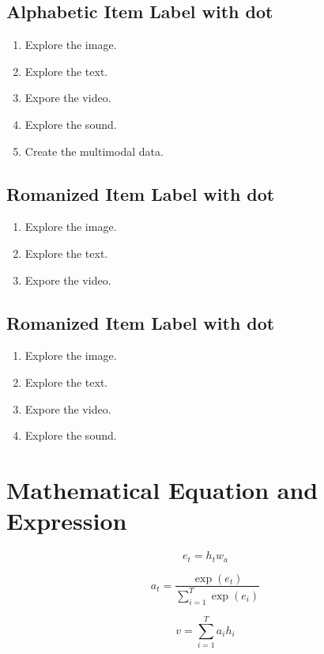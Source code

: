 \documentclass[11pt]{article}
\begin{document}
\subsection{Alphabetic Item Label with dot}
\begin{enumerate}[nosep, label=\Alph*.]
\item Explore the image.
\item Explore the text.
\item Expore the video.
\item Explore the sound.
\item Create the multimodal data.
\end{enumerate}

\subsection{Romanized Item Label with dot}
\begin{enumerate}[nosep, label=\roman*.]
\item Explore the image.
\item Explore the text.
\item Expore the video.
\end{enumerate}

\subsection{Romanized Item Label with dot}
\begin{enumerate}[nosep, label=\Roman*.]
\item Explore the image.
\item Explore the text.
\item Expore the video.
\item Explore the sound.
\end{enumerate}



\section{Mathematical Equation and Expression}
\label{ref:equation}
\begin{equation}
e_{t}=h_{t}w_{a}
\label{eqn:sampleEqn}
\end{equation}

\begin{equation*}
a_{t}  = \frac{\exp(e_{t})}{\sum^{T}_{i=1}\exp(e_{i})}
\end{equation*}

\begin{equation*}
v={\sum^{T}_{i=1} a_{i}h_{i}}
\end{equation*}
\end{document}
